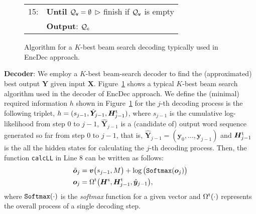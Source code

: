 \documentclass[11pt]{article}
\begin{document}
\begin{figure}[t]
\begin{tabular}{rp{71mm}}
      \\
  15:&\hspace{0.0em}
      \textbf{Until} ${\cal Q}_{\tt w} = \emptyset$
      \hspace{\fill}$\triangleright$ {\scriptsize finish if ${\cal Q}_{\tt w}$ is empty}
      \\
\  &\hspace{-1.2em}\textbf{Output}: ${\cal Q}_{\tt c}$
      \\
  \hline
 \end{tabular}
 \caption{Algorithm for a $K$-best beam search decoding typically used in EncDec approach.}
 \label{fig:beam_search}
\end{figure}



{\bf Decoder}:
We employ a $K$-best beam-search decoder to find the (approximated) best output $\hat{\bm{Y}}$ given input $\bm{X}$.
Figure~\ref{fig:beam_search} shows a typical $K$-best beam search algorithm used in the decoder of EncDec approach. 
We define the (minimal) required information $h$ shown in Figure~\ref{fig:beam_search} for the $j$-th decoding process is the following triplet, $h=(s_{j-1}, \hat{\bm{Y}}_{j-1},  \bm{H}^{\rm t}_{j-1})$, where
   $s_{j-1}$ is the cumulative log-likelihood from step 0 to $j-1$,
   $\hat{\bm{Y}}_{j-1}$ is a (candidate of) output word sequence generated so far from step 0 to $j-1$, that is, $\hat{\bm{Y}}_{j-1}=(\bm{y}_0, \dots, \bm{y}_{j-1})$
   and
   $\bm{H}^{\rm t}_{j-1}$ is the all the hidden states for calculating the $j$-th decoding process.
Then, the function {\tt calcLL} in Line 8 can be written as follows:
\begin{align}
 \displaystyle
 \tilde{\bm{o}}_j
 &= \displaystyle
 \bm{v}\big(s_{j-1}, {M}\big)
 +
 \log
 \big(
 {\tt Softmax} ( \bm{o}_{j} )
 \big)
 \nonumber\\
\displaystyle
 \bm{o}_j
 &=
 \Omega^{\rm t}
 \big(
 \bm{H}^{\rm s}, \bm{H}^{{\rm t}}_{j-1}, \hat{\bm{y}}_{j-1}
 \big)
,
 \label{eq:calc_output_score}
\end{align}
where ${\tt Softmax}(\cdot)$ is the {\it softmax} function for a given vector
and $\Omega^{\rm t}(\cdot)$ represents the overall process of a single decoding step. 
\end{document}
